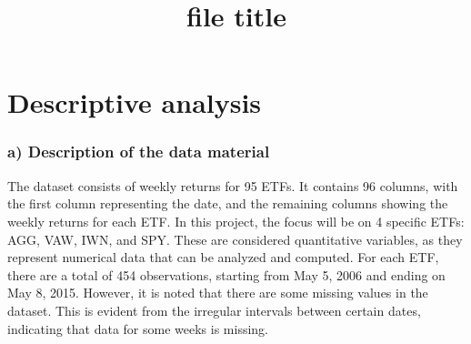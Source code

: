 \documentclass{rapport}
\title{file title} %
\begin{document}
\onehalfspacing


\subject{Subject} %


        
\buildmargins %
\buildcover %
\toc %

\section{Descriptive analysis}
\subsubsection*{\textbf{a)} Description of the data material}
\noindent
The dataset consists of weekly returns for 95 ETFs. It contains 96 columns, with the first column representing the date, and the remaining columns showing the weekly returns for each ETF.
In this project, the focus will be on 4 specific ETFs: AGG, VAW, IWN, and SPY. These are considered quantitative variables, as they represent numerical data that can be analyzed and computed.
For each ETF, there are a total of 454 observations, starting from May 5, 2006 and ending on May 8, 2015. However, it is noted that there are some missing values in the dataset. 
This is evident from the irregular intervals between certain dates, indicating that data for some weeks is missing.


\end{document}
